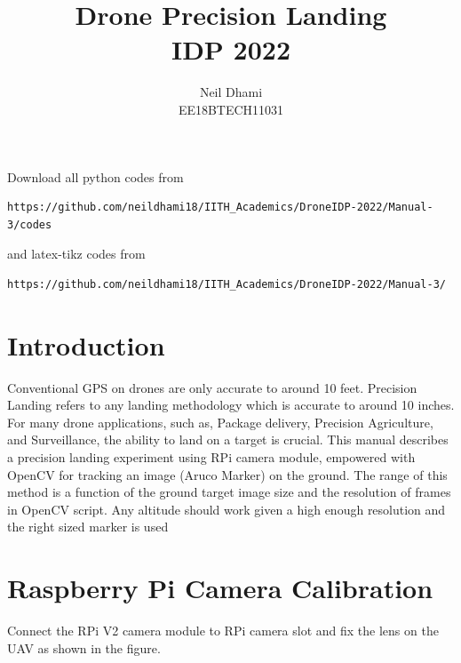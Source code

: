 \documentclass{article}
\begin{document}
\title{\vspace{-2.0cm}Drone Precision Landing\\IDP 2022}

\author{Neil Dhami \\EE18BTECH11031	}

\maketitle
Download all python codes from 
\begin{lstlisting}
https://github.com/neildhami18/IITH_Academics/DroneIDP-2022/Manual-3/codes
\end{lstlisting}

%
and latex-tikz codes from 
%
\begin{lstlisting}
https://github.com/neildhami18/IITH_Academics/DroneIDP-2022/Manual-3/
\end{lstlisting}

\section{Introduction}
Conventional GPS on drones are only accurate to around 10 feet. Precision Landing refers to any landing methodology which is accurate to around 10 inches. For many drone applications, such as, Package delivery, Precision Agriculture, and Surveillance, the ability to land on a target is crucial. This manual describes a precision landing experiment using RPi camera module, empowered with OpenCV for tracking an image (Aruco Marker) on the ground. The range of this method is a function of the ground target image size and the resolution of frames in OpenCV script. Any altitude should work given a high enough resolution and the right sized marker is used


\section{Raspberry Pi Camera Calibration}
Connect the RPi V2 camera module to RPi camera slot and fix the lens on the UAV as shown in the figure.
\end{document}
